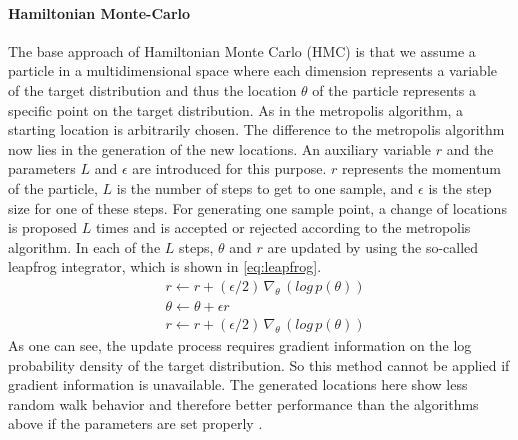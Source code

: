 \documentclass{article}
\begin{document}
\paragraph{Hamiltonian Monte-Carlo}
The base approach of Hamiltonian Monte Carlo (HMC) is that we assume a particle in a multidimensional space where each dimension represents a variable of the target distribution and thus the location $\theta$ of the particle represents a specific point on the target distribution. As in the metropolis algorithm, a starting location is arbitrarily chosen. The difference to the metropolis algorithm now lies in the generation of the new locations. An auxiliary variable $r$ and the parameters $L$ and $\epsilon$ are introduced for this purpose. $r$ represents the momentum of the particle, $L$ is the number of steps to get to one sample, and $\epsilon$ is the step size for one of these steps. For generating one sample point, a change of locations is proposed $L$ times and is accepted or rejected according to the metropolis algorithm. In each of the $L$ steps, $\theta$ and $r$ are updated by using the so-called leapfrog integrator, which is shown in \autoref{eq:leapfrog}. 
\begin{equation}
\begin{split}
\label{eq:leapfrog}
&r \leftarrow r + (\epsilon/2)  \, \nabla_\theta \, (log \, p(\theta))\\
&\theta \leftarrow \theta + \epsilon r\\
&r \leftarrow r + (\epsilon/2) \, \nabla_\theta \, (log \, p(\theta))
\end{split}
\end{equation}
As one can see, the update process requires gradient information on the log probability density of the target distribution. So this method cannot be applied if gradient information is unavailable. The generated locations here show less random walk behavior and therefore better performance than the algorithms above if the parameters are set properly \cite{hoffman2014no}.

\end{document}
